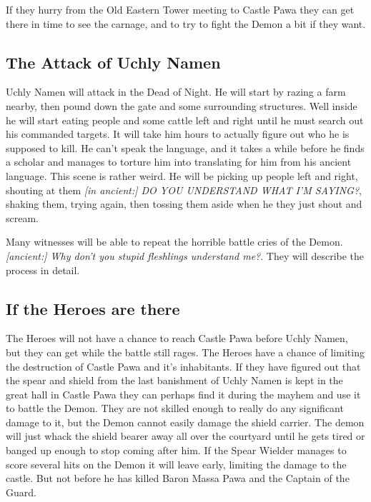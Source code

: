\documentclass[11pt, twoside, titlepage, a4paper]{report}
\begin{document}
If they hurry from the Old Eastern Tower meeting to Castle Pawa they can get there in time to see the carnage, and to try to fight the Demon a bit if they want.


\subsection*{The Attack of Uchly Namen}
Uchly Namen will attack in the Dead of Night. He will start by razing a farm nearby, then pound down the gate and some surrounding structures. Well inside he will start eating people and some cattle left and right until he must search out his commanded targets. It will take him hours to actually figure out who he is supposed to kill. He can't speak the language, and it takes a while before he finds a scholar and manages to torture him into translating for him from his ancient language. This scene is rather weird. He will be picking up people left and right, shouting at them \emph{[in ancient:] DO YOU UNDERSTAND WHAT I'M SAYING?}, shaking them, trying again, then tossing them aside when he they just shout and scream.

Many witnesses will be able to repeat the horrible battle cries of the Demon. \emph{[ancient:] Why don't you stupid fleshlings understand me?}. They will describe the process in detail.


\subsection*{If the Heroes are there}
The Heroes will not have a chance to reach Castle Pawa before Uchly Namen, but they can get while the battle still rages. The Heroes have a chance of limiting the destruction of Castle Pawa and it's inhabitants. If they have figured out that the spear and shield from the last banishment of Uchly Namen is kept in the great hall in Castle Pawa they can perhaps find it during the mayhem and use it to battle the Demon. They are not skilled enough to really do any significant damage to it, but the Demon cannot easily damage the shield carrier. The demon will just whack the shield bearer away all over the courtyard until he gets tired or banged up enough to stop coming after him. If the Spear Wielder manages to score several hits on the Demon it will leave early, limiting the damage to the castle. But not before he has killed Baron Massa Pawa and the Captain of the Guard.
\end{document}
